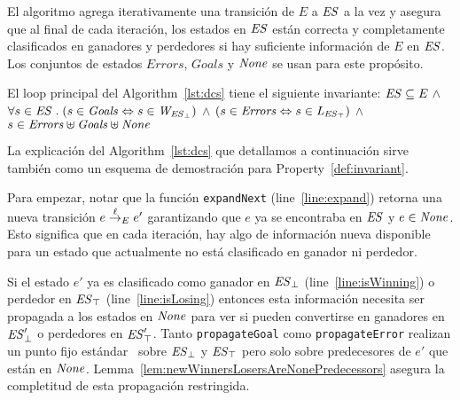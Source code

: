 El algoritmo agrega iterativamente una transición de $E$ a $\mathit{ES}$ a la vez y asegura que al final de cada iteración, los estados en $\mathit{ES}$ están correcta y completamente clasificados en ganadores y perdedores si hay suficiente información de $E$ en $\mathit{ES}$. Los conjuntos de estados $Errors$, 
$Goals$ y $\mathit{None}$ se usan para este propósito.

\begin{property}[Invariante]
\label{def:invariant}
El loop principal del Algorithm~\ref{lst:dcs} tiene el siguiente invariante: 
$\mathit{ES} \subseteq E \ \wedge $ $\forall s \in \mathit{ES} \;.\; (s\in\mathit{Goals} 
\Leftrightarrow 
s \in 
\mathit{W_{\mathit{\mathit{ES}_{\bot}}}})$ $\wedge$  $(s\in\mathit{Errors} 
\Leftrightarrow s \in \mathit{L_{\mathit{\mathit{ES}_{\top}}}})$ $\wedge$  
$s\in\mathit{Errors}\uplus\mathit{Goals}\uplus\mathit{None}$

\end{property}

La explicación del Algorithm~\ref{lst:dcs} que detallamos a continuación sirve también como un esquema de demostración para Property~\ref{def:invariant}.   

Para empezar, notar que la función \texttt{expandNext} 
(line~\ref{line:expand}) retorna una nueva transición $e \overset{\ell}{\rightarrow}_{E} e'$ 
garantizando que $e$ ya se encontraba en $\mathit{ES}$ y $e \in \mathit{None}$. 
Esto significa que en cada iteración, hay algo de información nueva disponible para un estado que actualmente no está clasificado en ganador ni perdedor.

Si el estado $e'$ ya es clasificado como ganador en
$\mathit{\mathit{ES}_{\bot}}$ (line~\ref{line:isWinning}) o
perdedor en $\mathit{\mathit{ES}_{\top}}$ (line~\ref{line:isLosing}) 
entonces esta información necesita ser propagada a los estados en $\mathit{None}$ para ver si pueden convertirse en ganadores en 
$\mathit{\mathit{ES}'_{\bot}}$ o perdedores en
$\mathit{\mathit{ES}'_{\top}}$. Tanto \texttt{propagateGoal} como
\texttt{propagateError} realizan un punto fijo estándar~\cite{Ramadge:1989:CDES} sobre
$\mathit{\mathit{ES}_{\bot}}$ y
$\mathit{\mathit{ES}_{\top}}$ pero solo sobre predecesores de $e'$ que están en $\mathit{None}$. 
Lemma~\ref{lem:newWinnersLosersAreNonePredecessors} asegura la completitud de esta propagación restringida.

